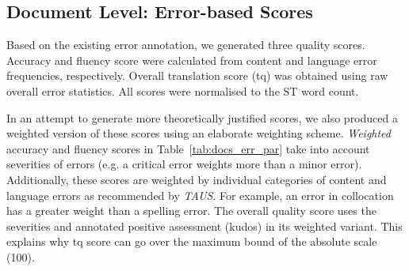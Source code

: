 




\subsection{\label{ssec:doc_err_res}Document Level: Error-based Scores}
Based on the existing error annotation, we generated three quality scores. Accuracy and fluency score were calculated from content and language error frequencies, respectively. Overall translation score (tq) was obtained using raw overall error statistics. All scores were normalised to the ST word count.

In an attempt to generate more theoretically justified scores, we also produced a weighted version of these scores using an elaborate weighting scheme. \textit{Weighted} accuracy and fluency scores in Table~\ref{tab:docs_err_par} take into account severities of errors (e.g. a critical error weights more than a minor error). Additionally, these scores are weighted by individual categories of content and language errors as recommended by \textit{TAUS}. For example, an error in collocation has a greater weight than a spelling error. 
The overall quality score uses the severities and annotated positive assessment (kudos) in its weighted variant. This explains why tq score can go over the maximum bound of the absolute scale (100).

